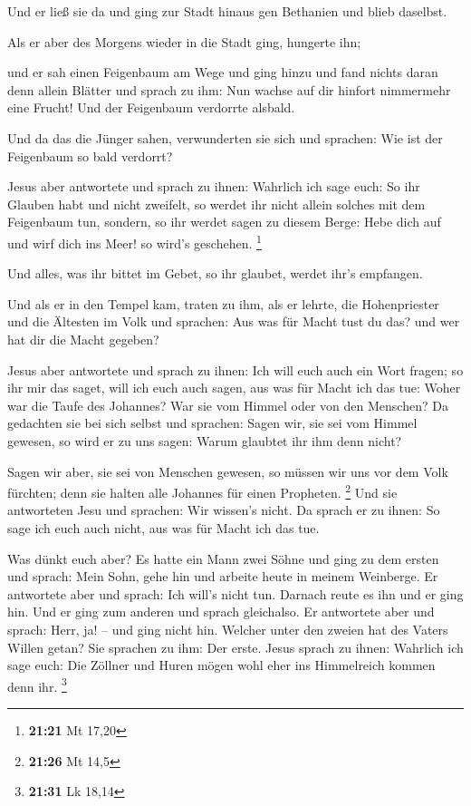  Und er ließ sie da und ging zur Stadt hinaus gen
Bethanien und blieb daselbst.

 Als er aber des Morgens wieder in die Stadt ging,
hungerte ihn;

 und er sah einen Feigenbaum am Wege und ging hinzu und
fand nichts daran denn allein Blätter und sprach zu ihm: Nun wachse auf
dir hinfort nimmermehr eine Frucht! Und der Feigenbaum verdorrte
alsbald.

 Und da das die Jünger sahen, verwunderten sie sich und
sprachen: Wie ist der Feigenbaum so bald verdorrt?

 Jesus aber antwortete und sprach zu ihnen: Wahrlich ich
sage euch: So ihr Glauben habt und nicht zweifelt, so werdet ihr nicht
allein solches mit dem Feigenbaum tun, sondern, so ihr werdet sagen zu
diesem Berge: Hebe dich auf und wirf dich ins Meer! so wird's geschehen.
\footnote{\textbf{21:21} Mt 17,20}

 Und alles, was ihr bittet im Gebet, so ihr glaubet,
werdet ihr's empfangen.

 Und als er in den Tempel kam, traten zu ihm, als er
lehrte, die Hohenpriester und die Ältesten im Volk und sprachen: Aus was
für Macht tust du das? und wer hat dir die Macht gegeben?

 Jesus aber antwortete und sprach zu ihnen: Ich will euch
auch ein Wort fragen; so ihr mir das saget, will ich euch auch sagen,
aus was für Macht ich das tue:  Woher war die Taufe des
Johannes? War sie vom Himmel oder von den Menschen? Da gedachten sie bei
sich selbst und sprachen: Sagen wir, sie sei vom Himmel gewesen, so wird
er zu uns sagen: Warum glaubtet ihr ihm denn nicht?

 Sagen wir aber, sie sei von Menschen gewesen, so müssen
wir uns vor dem Volk fürchten; denn sie halten alle Johannes für einen
Propheten. \footnote{\textbf{21:26} Mt 14,5}  Und sie
antworteten Jesu und sprachen: Wir wissen's nicht. Da sprach er zu
ihnen: So sage ich euch auch nicht, aus was für Macht ich das tue.

 Was dünkt euch aber? Es hatte ein Mann zwei Söhne und
ging zu dem ersten und sprach: Mein Sohn, gehe hin und arbeite heute in
meinem Weinberge.  Er antwortete aber und sprach: Ich
will's nicht tun. Darnach reute es ihn und er ging hin. 
Und er ging zum anderen und sprach gleichalso. Er antwortete aber und
sprach: Herr, ja! -- und ging nicht hin.  Welcher unter
den zweien hat des Vaters Willen getan? Sie sprachen zu ihm: Der erste.
Jesus sprach zu ihnen: Wahrlich ich sage euch: Die Zöllner und Huren
mögen wohl eher ins Himmelreich kommen denn ihr. \footnote{\textbf{21:31}
  Lk 18,14}

